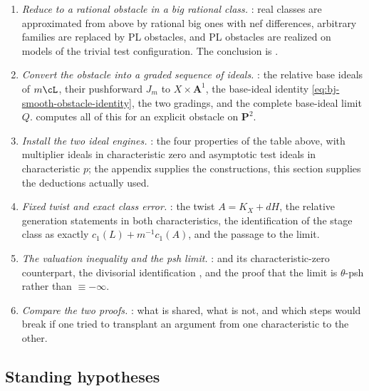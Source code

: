 \begin{enumerate}
\item\label{itm:ch40-task:reduction}
 \emph{Reduce to a rational obstacle in a big rational class.}
 : real classes are approximated from above by
 rational big ones with nef differences, arbitrary families are replaced by
 PL obstacles, and PL obstacles are realized on models of the trivial test
 configuration.  The conclusion is
 .
\item\label{itm:ch40-task:ideals}
 \emph{Convert the obstacle into a graded sequence of ideals.}
 : the relative base ideals of $m\cL$, their
 pushforward $J_m$ to $X\times\mathbf A^1$, the base-ideal identity
 \eqref{eq:bj-smooth-obstacle-identity}, the two gradings, and the complete
 base-ideal limit $Q$.   computes all of this
 for an explicit obstacle on $\mathbf P^2$.
\item\label{itm:ch40-task:engines}
 \emph{Install the two ideal engines.}  : the four
 properties of the table above, with multiplier ideals in characteristic
 zero and asymptotic test ideals in characteristic $p$; the appendix
  supplies the constructions, this section supplies the
 deductions actually used.
\item\label{itm:ch40-task:twist}
 \emph{Fixed twist and exact class error.}  : the
 twist $A=K_X+dH$, the relative generation statements in both
 characteristics, the identification of the stage class as exactly
 $c_1(L)+m^{-1}c_1(A)$, and the passage to the limit.
\item\label{itm:ch40-task:valuation}
 \emph{The valuation inequality and the psh limit.}
 :  and its
 characteristic-zero counterpart, the divisorial identification
 , and the proof that the
 limit is $\theta$-psh rather than $\equiv-\infty$.
\item\label{itm:ch40-task:comparison}
 \emph{Compare the two proofs.}  : what is shared,
 what is not, and which steps would break if one tried to transplant an
 argument from one characteristic to the other.
\end{enumerate}

\subsection{Standing hypotheses}
\label{sec:ch40-hypotheses}


